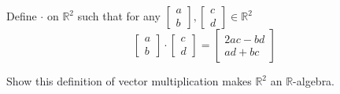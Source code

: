 \documentclass{article}
\begin{document}
\setcounter{problem}{116}
\begin{problem}
Define $\cdot$ on $\mathbb{R}^{2}$ such that for any $\begin{bmatrix}
a \\
b
\end{bmatrix},
\begin{bmatrix}
c \\
d
\end{bmatrix}
\in \mathbb{R}^{2}$
\[
\begin{bmatrix}
a \\
b
\end{bmatrix}
\cdot
\begin{bmatrix}
c \\
d
\end{bmatrix}
=
\begin{bmatrix}
2ac-bd	\\
ad + bc
\end{bmatrix}
\]

Show this definition of vector multiplication makes $\mathbb{R}^{2}$ an $\mathbb{R}$-algebra.
\end{problem}
\end{document}

